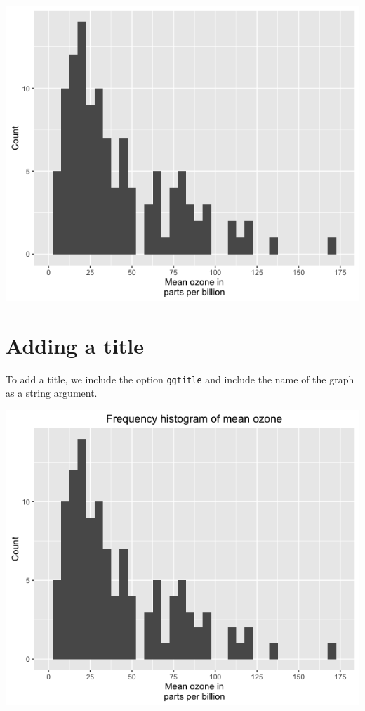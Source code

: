 \begin{center}\includegraphics[width=0.55\linewidth]{0_all_posts_pdf/histogram_7-1} \end{center}

\section{Adding a title}\label{adding-a-title}

To add a title, we include the option \texttt{ggtitle} and include the
name of the graph as a string argument.

\begin{Shaded}
\begin{Highlighting}[]
\StringTok{ }\NormalTok{(} \StringTok{ }
\StringTok{      }\NormalTok{(}\NormalTok{(}  \NormalTok{) +}
\StringTok{      }\NormalTok{(} \NormalTok{,}
\StringTok{        } \NormalTok{(}\NormalTok{, }\NormalTok{, }\NormalTok{),}
\StringTok{        }\NormalTok{(}\NormalTok{, }\NormalTok{)) +}
\StringTok{      }\NormalTok{(} \NormalTok{) +}
\StringTok{      }\NormalTok{(}\NormalTok{)}
\end{Highlighting}
\end{Shaded}

\begin{center}\includegraphics[width=0.55\linewidth]{0_all_posts_pdf/histogram_8-1} \end{center}

